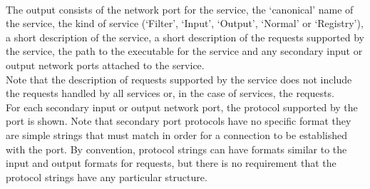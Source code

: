 \insertFullUtilityParameters\\

The output consists of the \yarp{} network port for the service, the `canonical' name of
the service, the kind of service (`Filter', `Input', `Output', `Normal' or `Registry'), a
short description of the service, a short description of the requests supported by the
service, the path to the executable for the service and any secondary input or output
\yarp{} network ports attached to the service.\\

Note that the description of requests supported by the service does not include the
 requests handled by all services or, in the case of
 services, the 
requests.\\

For each secondary input or output \yarp{} network port, the protocol supported by the
port is shown.
Note that secondary port protocols have no specific format \longDash{} they are simple
strings that must match in order for a connection to be established with the port.
By convention, protocol strings can have formats similar to the input and output formats
for requests, but there is no requirement that the protocol strings have any particular
structure.\\

